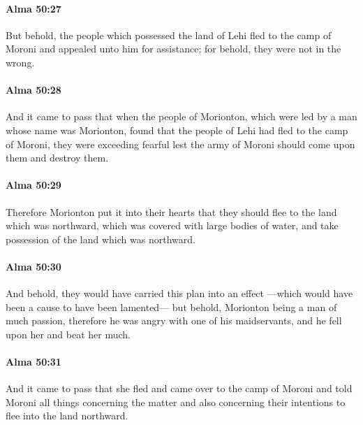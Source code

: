 		\paragraph{Alma 50:27} %
			\label{ALMA-50-27}

			But behold, the people which possessed the land of Lehi
			fled to the camp of Moroni
			and appealed unto him for assistance;
			for behold, they were not in the wrong.

		\paragraph{Alma 50:28} %
			\label{ALMA-50-28}

			And it came to pass that when the people of Morionton,
			which were led by a man whose name was Morionton,
			found that the people of Lehi had fled to the camp of Moroni,
			they were exceeding fearful
			lest the army of Moroni should come upon them and destroy them.

		\paragraph{Alma 50:29} %
			\label{ALMA-50-29}

			Therefore Morionton put it into their hearts
			that they should flee to the land which was northward,
			which was covered with large bodies of water,
			and take possession of the land which was northward.

		\paragraph{Alma 50:30} %
			\label{ALMA-50-30}

			And behold, they would have carried this plan into an effect
			---which would have been a cause to have been lamented---
			but behold, Morionton being a man of much passion,
			therefore he was angry with one of his maidservants,
			and he fell upon her and beat her much.

		\paragraph{Alma 50:31} %
			\label{ALMA-50-31}

			And it came to pass that she fled and came over to the camp of Moroni
			and told Moroni all things concerning the matter
			and also concerning their intentions to flee into the land northward.

